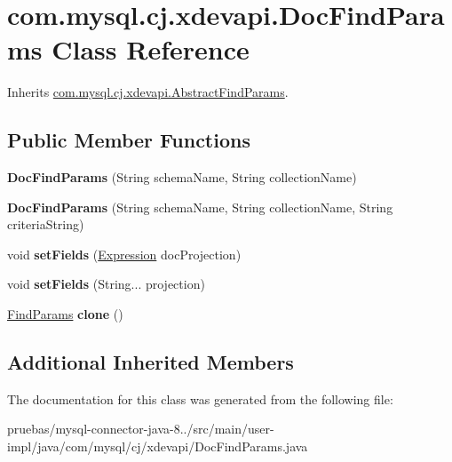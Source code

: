 \hypertarget{classcom_1_1mysql_1_1cj_1_1xdevapi_1_1_doc_find_params}{}\section{com.\+mysql.\+cj.\+xdevapi.\+Doc\+Find\+Params Class Reference}
\label{classcom_1_1mysql_1_1cj_1_1xdevapi_1_1_doc_find_params}


Inherits \mbox{\hyperlink{classcom_1_1mysql_1_1cj_1_1xdevapi_1_1_abstract_find_params}{com.\+mysql.\+cj.\+xdevapi.\+Abstract\+Find\+Params}}.

\subsection*{Public Member Functions}
\begin{DoxyCompactItemize}
\item 
\mbox{\label{classcom_1_1mysql_1_1cj_1_1xdevapi_1_1_doc_find_params_ac31ada642046a7d3347c61569f742b51}} 
{\bfseries Doc\+Find\+Params} (String schema\+Name, String collection\+Name)
\item 
\mbox{\label{classcom_1_1mysql_1_1cj_1_1xdevapi_1_1_doc_find_params_a5cf38a2dddc5c43c24a945dd106dfe82}} 
{\bfseries Doc\+Find\+Params} (String schema\+Name, String collection\+Name, String criteria\+String)
\item 
\mbox{\label{classcom_1_1mysql_1_1cj_1_1xdevapi_1_1_doc_find_params_ae329a9e3cd381af7fa643016bf095061}} 
void {\bfseries set\+Fields} (\mbox{\hyperlink{classcom_1_1mysql_1_1cj_1_1xdevapi_1_1_expression}{Expression}} doc\+Projection)
\item 
\mbox{\label{classcom_1_1mysql_1_1cj_1_1xdevapi_1_1_doc_find_params_a01e55531bef9b0d461c559257f5b6b0c}} 
void {\bfseries set\+Fields} (String... projection)
\item 
\mbox{\label{classcom_1_1mysql_1_1cj_1_1xdevapi_1_1_doc_find_params_af7624d4542d4cef6cb80f12e3feec405}} 
\mbox{\hyperlink{interfacecom_1_1mysql_1_1cj_1_1xdevapi_1_1_find_params}{Find\+Params}} {\bfseries clone} ()
\end{DoxyCompactItemize}
\subsection*{Additional Inherited Members}


The documentation for this class was generated from the following file\+:\begin{DoxyCompactItemize}
\item 
pruebas/mysql-\/connector-\/java-\/8../src/main/user-\/impl/java/com/mysql/cj/xdevapi/Doc\+Find\+Params.\+java\end{DoxyCompactItemize}
